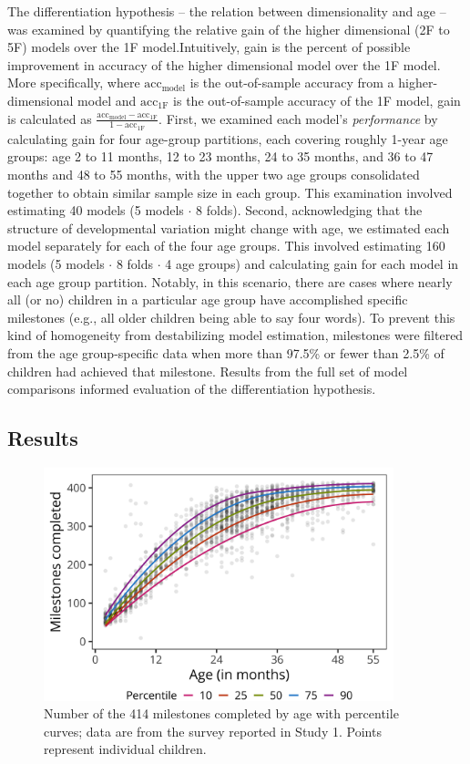 \documentclass[man, floatsintext]{apa7}
\begin{document}
The differentiation hypothesis -- the relation between dimensionality and age -- was examined by quantifying the relative gain of the higher dimensional (2F to 5F) models over the 1F model.Intuitively, gain is the percent of possible improvement in accuracy of the higher dimensional model over the 1F model. More specifically,
where $\text{acc}_\text{model}$ is the out-of-sample accuracy from a
higher-dimensional model and $\text{acc}_\text{1F}$ is the
out-of-sample accuracy of the 1F model, gain is calculated as
$\frac{\text{acc}_\text{model} - \text{acc}_\text{1F}}{1 - \text{acc}_\text{1F}}$.
First, we examined each model's \emph{performance} by calculating gain for four age-group partitions, each covering roughly 1-year age groups: age 2 to 11 months, 12 to 23 months, 24 to 35 months, and 36 to 47 months and 48 to 55 months, with the upper two age groups consolidated together to obtain similar sample size in each group. This examination involved estimating 40 models (5 models $\cdot$ 8 folds). Second, acknowledging that the structure of developmental variation might change with age, we estimated each model separately for each of the four age groups. This involved estimating 160 models
(5 models $\cdot$ 8 folds $\cdot$ 4 age groups) and calculating gain for each model in each age group partition. Notably, in this scenario, there are cases where nearly all (or no) children in a particular age group have accomplished specific milestones (e.g., all older children being able to say four words). To prevent this kind of homogeneity from destabilizing model estimation, milestones were filtered from the age group-specific data when more than 97.5\% or fewer than 2.5\% of children had achieved that milestone. Results from the full set of model comparisons informed evaluation of the differentiation hypothesis.

\subsection{Results}

\begin{figure}
\centering
\includegraphics[width=4in]{figures/01_achieve_by_age.png}
\caption{Number of the 414 milestones completed by age with percentile curves; data are from the survey reported in Study 1. Points represent individual children.}
\label{fig:partage}
\end{figure}
\end{document}
